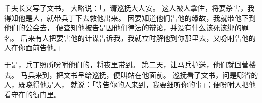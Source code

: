 {千夫长又写了文书，
大略说：「{}，请巡抚{}大人安。
这人被{}人拿住，将要杀害，我得知他是{}人，就带兵丁下去救他出来。
因要知道他们告他的缘故，我就带他下到他们的公会去，
便查知他被告是因他们律法的辩论，并没有什么该死该绑的罪名。
后来有人把要害他的计谋告诉我，我就立时解他到你那里去，又吩咐告他的人在你面前告他。」
\par }{\PP {}于是，兵丁照所吩咐他们的，将{}夜里带到{}。
第二天，让马兵护送，他们就回营楼去。
马兵来到{}，把文书呈给巡抚，便叫{}站在他面前。
巡抚看了文书，问{}是哪省的人，既晓得他是{}人，
就说：「等告你的人来到，我要细听你的事」；便吩咐人把他看守在{}的衙门里。

}
